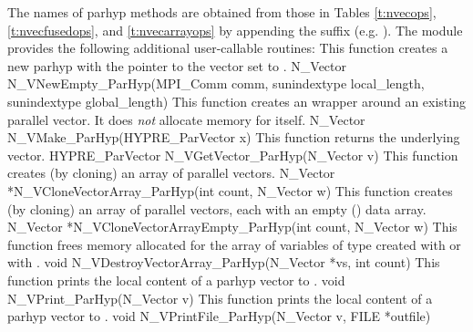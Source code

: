 The names of parhyp methods are obtained from those in Tables \ref{t:nvecops},
\ref{t:nvecfusedops}, and \ref{t:nvecarrayops}
by appending the suffix  (e.g. ).
The module {\nvecph} provides the following additional user-callable routines:
{
  This function creates a new parhyp  with the pointer to the {\hypre} 
  vector set to .
}
{
  N\_Vector N\_VNewEmpty\_ParHyp(MPI\_Comm comm, sunindextype local\_length,
  sunindextype global\_length)
}
{  
  This function creates an  wrapper around an existing
  {\hypre} parallel vector. It does {\em not} allocate memory for  
  itself.  
}
{
  N\_Vector N\_VMake\_ParHyp(HYPRE\_ParVector x)
}
{  
  This function returns the underlying {\hypre} vector.
}
{
  HYPRE\_ParVector N\_VGetVector\_ParHyp(N\_Vector v)
}
{ 
  This function creates (by cloning) an array of  parallel vectors.
}
{
  N\_Vector *N\_VCloneVectorArray\_ParHyp(int count, N\_Vector w)
}
{
  This function creates (by cloning) an array of  parallel vectors,
  each with an empty () data array.
}
{
  N\_Vector *N\_VCloneVectorArrayEmpty\_ParHyp(int count, N\_Vector w)
}
{ 
  This function frees memory allocated for the array of   variables of
  type  created with  or with
  .
}
{
  void N\_VDestroyVectorArray\_ParHyp(N\_Vector *vs, int count)
}
{  
  This function prints the local content of a parhyp vector to .
}
{   
  void N\_VPrint\_ParHyp(N\_Vector v)
}
{  
  This function prints the local content of a parhyp vector to .
}
{   
  void N\_VPrintFile\_ParHyp(N\_Vector v, FILE *outfile)
}

